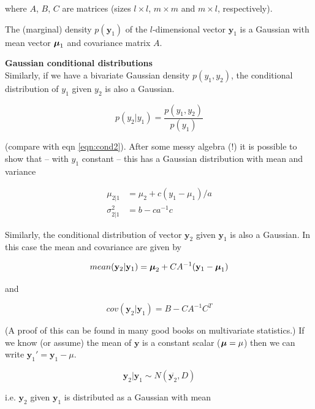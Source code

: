 \documentclass[a4paper, 11pt, amsmath, graphicx]{article}\usepackage[]{graphicx}\usepackage[]{color}
\def\bmu{{\mbox{\boldmath $\mu$}}}
\begin{document}
where $A$, $B$, $C$ are matrices (sizes $l \times l$, $m \times m$ and $m \times l$, respectively). 

The (marginal) density $p(\mathbf{y}_1)$ of the $l$-dimensional vector $\mathbf{y}_1$ is a Gaussian with mean vector $\bmu_1$ and covariance matrix $A$.

\vspace{0.4cm}
\textbf{Gaussian conditional distributions}
\\

Similarly, if we have a bivariate Gaussian density $p(y_1, y_2)$, the conditional distribution of $y_1$ given $y_2$ is also a Gaussian. 

\begin{equation}
  p(y_2|y_1) = \frac{ p(y_1, y_2) }{ p(y_1) }
\end{equation}

(compare with eqn \ref{eqn:cond2}). After some messy algebra (!) it is possible to show that -- with $y_1$ constant -- this has a Gaussian distribution with mean and variance

\begin{align}
  \mu_{2|1} & = \mu_2 + c(y_1 - \mu_1) / a   \\
  \sigma_{2|1}^2 & = b - c a^{-1} c
\end{align}

Similarly, the conditional distribution of vector $\mathbf{y}_2$ given $\mathbf{y}_1$ is also a Gaussian. In this case the mean and covariance are given by 

\begin{equation}
  mean(\mathbf{y}_2|\mathbf{y}_1) = \bmu_2 + C A^{-1} (\mathbf{y}_1 - \bmu_1)
\end{equation}

and

\begin{equation}
  cov(\mathbf{y}_2|\mathbf{y}_1) = B - CA^{-1} C^T
\end{equation}

(A proof of this can be found in many good books on multivariate statistics.) If we know (or assume) the mean of $\mathbf{y}$ is a constant scalar ($\bmu = \mu$) then we can write $\mathbf{y}_1' = \mathbf{y}_1 - \mu$.

\begin{equation}
  \mathbf{y}_2|\mathbf{y}_1 \sim N(\overline{\mathbf{y}_2}, D)
\end{equation}

i.e. $\mathbf{y}_2$ given $\mathbf{y}_1$ is distributed as a Gaussian with mean 
\end{document}
